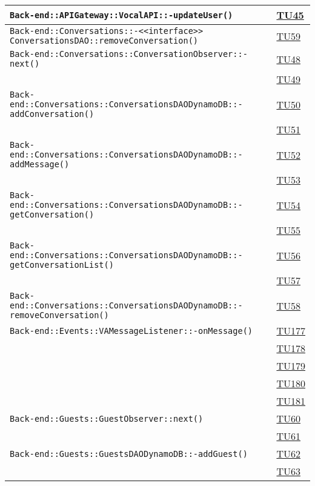 \begin{longtable}{|>{\centering}m{12cm}|m{1cm}<{\centering}|}
\texttt{Back-end::APIGateway::VocalAPI::-\linebreak updateUser()} & \hyperlink{TU45}{TU45}\\ \hline
\texttt{Back-end::Conversations::-\linebreak <<interface>> ConversationsDAO::removeConversation()} & \hyperlink{TU59}{TU59}\\ \hline
\texttt{Back-end::Conversations::ConversationObserver::-\linebreak next()} & \hyperlink{TU48}{TU48}\\ & \hyperlink{TU49}{TU49}\\ \hline
\texttt{Back-end::Conversations::ConversationsDAODynamoDB::-\linebreak addConversation()} & \hyperlink{TU50}{TU50}\\ & \hyperlink{TU51}{TU51}\\ \hline
\texttt{Back-end::Conversations::ConversationsDAODynamoDB::-\linebreak addMessage()} & \hyperlink{TU52}{TU52}\\ & \hyperlink{TU53}{TU53}\\ \hline
\texttt{Back-end::Conversations::ConversationsDAODynamoDB::-\linebreak getConversation()} & \hyperlink{TU54}{TU54}\\ & \hyperlink{TU55}{TU55}\\ \hline
\texttt{Back-end::Conversations::ConversationsDAODynamoDB::-\linebreak getConversationList()} & \hyperlink{TU56}{TU56}\\ & \hyperlink{TU57}{TU57}\\ \hline
\texttt{Back-end::Conversations::ConversationsDAODynamoDB::-\linebreak removeConversation()} & \hyperlink{TU58}{TU58}\\ \hline
\texttt{Back-end::Events::VAMessageListener::-\linebreak onMessage()} & \hyperlink{TU177}{TU177}\\ & \hyperlink{TU178}{TU178}\\ & \hyperlink{TU179}{TU179}\\ & \hyperlink{TU180}{TU180}\\ & \hyperlink{TU181}{TU181}\\ \hline
\texttt{Back-end::Guests::GuestObserver::next()} & \hyperlink{TU60}{TU60}\\ & \hyperlink{TU61}{TU61}\\ \hline
\texttt{Back-end::Guests::GuestsDAODynamoDB::-\linebreak addGuest()} & \hyperlink{TU62}{TU62}\\ & \hyperlink{TU63}{TU63}\\ \hline

\end{longtable}
